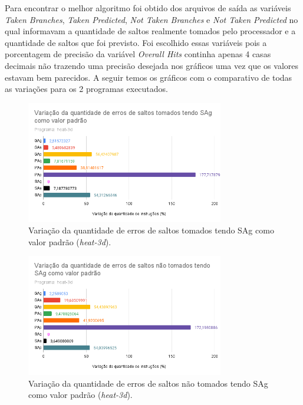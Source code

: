 \documentclass[journal, twoside]{IEEEtran}
\begin{document}
Para encontrar o melhor algoritmo foi obtido dos arquivos de saída as variáveis \textit{Taken Branches}, \textit{Taken Predicted}, \textit{Not Taken Branches} e \textit{Not Taken Predicted} no qual informavam a quantidade de saltos realmente tomados pelo processador e a quantidade de saltos que foi previsto. Foi escolhido essas variáveis pois a porcentagem de precisão da variável \textit{Overall Hits} continha apenas 4 casas decimais não trazendo uma precisão desejada nos gráficos uma vez que os valores estavam bem parecidos. A seguir temos os gráficos com o comparativo de todas as variações para os 2 programas executados. 
\begin{figure}[H]
    \centering
    \captionsetup{justification=centering}
    \includegraphics[width=3.4in]{figure/saltos_tomados_(heat-3d).png}
    \caption{Variação da quantidade de erros de saltos tomados tendo SAg como valor padrão (\textit{heat-3d}).}
    \label{fig:saltos-nao-tomados-heat}
\end{figure}

\begin{figure}[H]
    \centering
    \captionsetup{justification=centering}
    \includegraphics[width=3.4in]{figure/saltos_nao_tomados_(heat-3d).png}
    \caption{Variação da quantidade de erros de saltos não tomados tendo SAg como valor padrão (\textit{heat-3d}).}
    \label{fig:saltos-nao-tomados-heat}
\end{figure}
\end{document}
